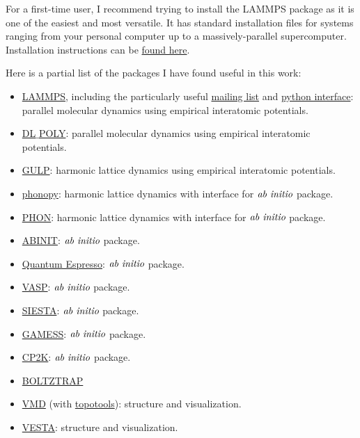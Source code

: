 For a first-time user, I recommend trying to install the LAMMPS 
package as it is one of the easiest and most versatile. It has 
standard installation files for systems ranging from your 
personal computer up to a massively-parallel supercomputer. 
Installation instructions can be 
\href{http://lammps.sandia.gov/doc/Section_start.html#start_2}{found here}. 

Here is a partial list of the packages I have found useful 
in this work:

\begin{itemize}
\item \href{http://lammps.sandia.gov/}{LAMMPS}, including the particularly 
useful 
\href{http://lammps.sandia.gov/threads/threads.html}{mailing list} 
and
\href{http://lammps.sandia.gov/doc/Section_python.html}
{python interface}: parallel molecular dynamics using empirical interatomic 
potentials.
\item \href{http://www.stfc.ac.uk/CSE/randd/ccg/software/DL_POLY/25526.aspx}
{DL$\_$POLY}: parallel molecular dynamics using empirical interatomic 
potentials.
\item \href{http://projects.ivec.org/gulp/}{GULP}: harmonic lattice 
dynamics using empirical interatomic potentials. 
\item \href{http://phonopy.sourceforge.net/}{phonopy}: harmonic 
lattice dynamics with interface for $\emph{ab initio}$ package. 
\item \href{http://www.homepages.ucl.ac.uk/~ucfbdxa/phon/}{PHON}: 
harmonic lattice dynamics with interface for $\emph{ab initio}$ package.
\item \href{http://www.abinit.org/}{ABINIT}: $\emph{ab initio}$ package. 
\item \href{http://www.quantum-espresso.org/}{Quantum Espresso}: 
$\emph{ab initio}$ package. 
\item \href{https://www.vasp.at/}{VASP}: $\emph{ab initio}$ package. 
\item \href{http://icmab.cat/leem/siesta/}{SIESTA}: 
$\emph{ab initio}$ package. 
\item \href{http://www.msg.ameslab.gov/gamess/}{GAMESS}: 
$\emph{ab initio}$ package.
\item \href{http://www.cp2k.org/}{CP2K}: 
$\emph{ab initio}$ package.
\item \href{http://www.icams.de/content/departments/ams/madsen/boltztrap.html}{BOLTZTRAP} 
\item \href{http://www.ks.uiuc.edu/Research/vmd/}{VMD} 
(with 
\href{https://sites.google.com/site/akohlmey/software/topotools}
{topotools}): structure and visualization. 
\item \href{http://jp-minerals.org/vesta/en/}{VESTA}: structure and 
visualization. 
\end{itemize}

